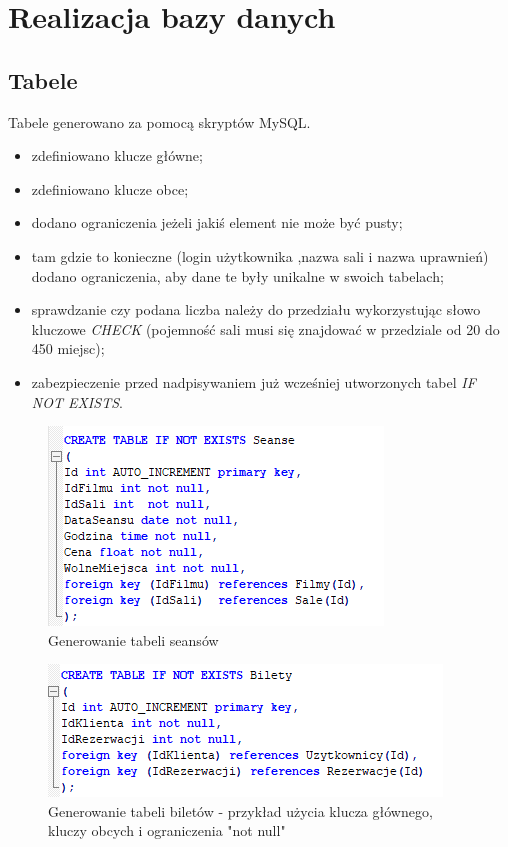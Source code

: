 \section{Realizacja bazy danych}

\subsection{Tabele}

Tabele generowano za pomocą skryptów MySQL.

\begin{itemize}
	\item zdefiniowano klucze główne;
	\item zdefiniowano klucze obce;
	\item dodano ograniczenia jeżeli jakiś element nie może być pusty;
	\item tam gdzie to konieczne (login użytkownika ,nazwa sali i nazwa uprawnień) dodano ograniczenia, aby dane te były unikalne w swoich tabelach;
	\item sprawdzanie czy podana liczba należy do przedziału wykorzystując słowo kluczowe \textit{CHECK} (pojemność sali musi się znajdować w przedziale od 20 do 450 miejsc);
	\item zabezpieczenie przed nadpisywaniem już wcześniej utworzonych tabel \textit{IF NOT EXISTS}.
\end{itemize}

\begin{figure} [H]
	\centering
	\includegraphics[width=0.6\linewidth]{rozdzial04/T_Seanse.png}
	\caption{Generowanie tabeli seansów}
	\label{fig:t_seanse}
\end{figure}

\begin{figure} [H]
	\centering
	\includegraphics[width=0.6\linewidth]{rozdzial04/T_Bilety.png}
	\caption{Generowanie tabeli biletów - przykład użycia klucza głównego, kluczy obcych i ograniczenia "not null"}
	\label{fig:t_bilety}
\end{figure}

